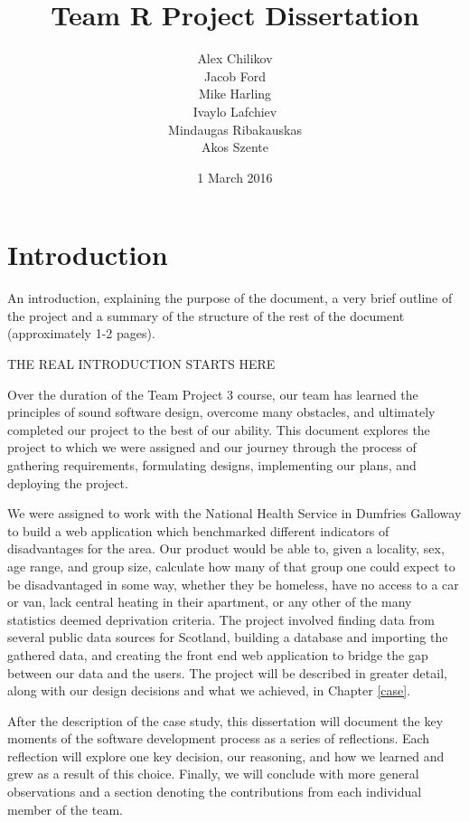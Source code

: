 \documentclass{l3proj}
\begin{document}
\title{Team R Project Dissertation}
\author{Alex Chilikov \\
        Jacob Ford \\
        Mike Harling \\
        Ivaylo Lafchiev \\
        Mindaugas Ribakauskas \\
        Akos Szente}
\date{1 March 2016}
\maketitle
\educationalconsent
\tableofcontents
\chapter{Introduction}
\label{intro}

An introduction, explaining the purpose of the document, a very brief outline of the project and a summary of the structure of the rest of the document (approximately 1-2 pages).

THE REAL INTRODUCTION STARTS HERE

Over the duration of the Team Project 3 course, our team has learned the principles of sound software design, overcome many obstacles, and ultimately completed our project to the best of our ability. This document explores the project to which we were assigned and our journey through the process of gathering requirements, formulating designs, implementing our plans, and deploying the project.

We were assigned to work with the National Health Service in Dumfries Galloway to build a web application which benchmarked different indicators of disadvantages for the area. Our product would be able to, given a locality, sex, age range, and group size, calculate how many of that group one could expect to be disadvantaged in some way, whether they be homeless, have no access to a car or van, lack central heating in their apartment, or any other of the many statistics deemed deprivation criteria. The project involved finding data from several public data sources for Scotland, building a database and importing the gathered data, and creating the front end web application to bridge the gap between our data and the users. The project will be described in greater detail, along with our design decisions and what we achieved, in Chapter \ref{case}.

After the description of the case study, this dissertation will document the key moments of the software development process as a series of reflections. Each reflection will explore one key decision, our reasoning, and how we learned and grew as a result of this choice. Finally, we will conclude with more general observations and a section denoting the contributions from each individual member of the team.
\end{document}
